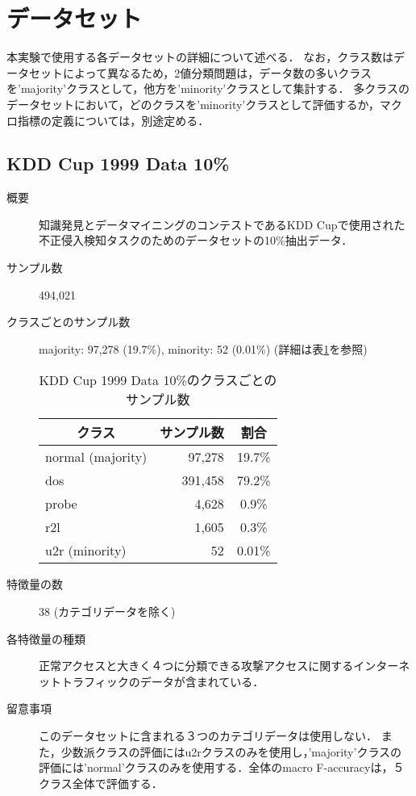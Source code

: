 \section{データセット}
\label{sec:dataset}
本実験で使用する各データセットの詳細について述べる．
なお，クラス数はデータセットによって異なるため，2値分類問題は，データ数の多いクラスを'majority'クラスとして，他方を'minority'クラスとして集計する．
多クラスのデータセットにおいて，どのクラスを'minority'クラスとして評価するか，マクロ指標の定義については，別途定める．

\subsection{KDD Cup 1999 Data 10\%}
\begin{description}
    \item[概要] 知識発見とデータマイニングのコンテストであるKDD Cupで使用された不正侵入検知タスクのためのデータセットの10\%抽出データ．
    \item[サンプル数] 494,021
    \item[クラスごとのサンプル数] majority: 97,278 (19.7\%), minority: 52 (0.01\%) (詳細は表\ref{tab:kddcup1999data10percent}を参照)
        \begin{table}[htbp]
            \centering
            \caption{KDD Cup 1999 Data 10\%のクラスごとのサンプル数}
                \label{tab:kddcup1999data10percent}
                \begin{tabular}{lrc} \hline
                    \multicolumn{1}{c}{クラス}&
                    \multicolumn{1}{c}{サンプル数}&
                    \multicolumn{1}{c}{割合}\\
                    \hline
                    \hline
                    normal  (majority)& 97,278 & 19.7\% \\
                    dos & 391,458 & 79.2\% \\
                    probe & 4,628 & 0.9\% \\
                    r2l & 1,605 & 0.3\% \\
                    u2r (minority)& 52 & 0.01\% \\ 
                    \hline
                \end{tabular}
        \end{table}
    \item[特徴量の数] 38 (カテゴリデータを除く)
    \item[各特徴量の種類] 正常アクセスと大きく４つに分類できる攻撃アクセスに関するインターネットトラフィックのデータが含まれている．
    \item[留意事項] このデータセットに含まれる３つのカテゴリデータは使用しない．
                   また，少数派クラスの評価にはu2rクラスのみを使用し，'majority'クラスの評価には'normal'クラスのみを使用する．全体のmacro F-accuracyは，５クラス全体で評価する．
\end{description}

